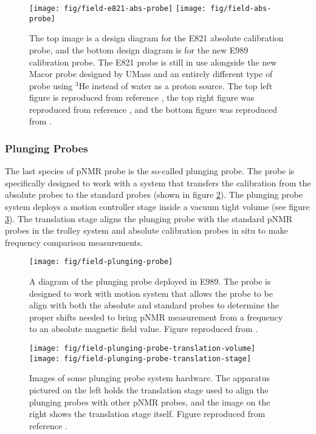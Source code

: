 \begin{figure}
\label{fig:field-e821-abs-probe}
\centering
\texttt{[image: fig/field-e821-abs-probe]}
\texttt{[image: fig/field-abs-probe]}
\caption{
    The top image is a design diagram for the E821 absolute calibration probe, and the bottom design diagram is for the new E989 calibration probe.  The E821 probe is still in use alongside the new Macor probe designed by UMass and an entirely different type of probe using $\mathrm{^3He}$ instead of water as a proton source.  The top left figure is reproduced from reference \cite{e821-prd}, the top right figure was reproduced from reference \cite{kawall-priv}, and the bottom figure was reproduced from \cite{flay-priv}.
}
\end{figure}

\subsubsection{Plunging Probes}

The last species of pNMR probe is the so-called plunging probe. The probe is specifically designed to work with a system that transfers the calibration from the absolute probes to the standard probes (shown in figure \ref{fig:field-plunging-probe}).  The plunging probe system deploys a motion controller stage inside a vacuum tight volume (see figure \ref{fig:field-plunging-probe-translation-stage}).  The translation stage aligns the plunging probe with the standard pNMR probes in the trolley system and absolute calibration probes in situ to make frequency comparison measurements.

\begin{figure}
\label{fig:field-plunging-probe}
\centering
\texttt{[image: fig/field-plunging-probe]}
\caption{A diagram of the plunging probe deployed in E989.  The probe is designed to work with motion system that allows the probe to be align with both the absolute and standard probes to determine the proper shifts needed to bring pNMR measurement from a frequency to an absolute magnetic field value. Figure reproduced from \cite{flay-priv}.}
\end{figure}

\begin{figure}
\label{fig:field-plunging-probe-translation-stage}
\centering
\texttt{[image: fig/field-plunging-probe-translation-volume]}
\texttt{[image: fig/field-plunging-probe-translation-stage]}
\caption{Images of some plunging probe system hardware.  The apparatus pictured on the left holds the translation stage used to align the plunging probes with other pNMR probes, and the image on the right shows the translation stage itself. Figure reproduced from reference \cite{flay-priv}.}
\end{figure}

